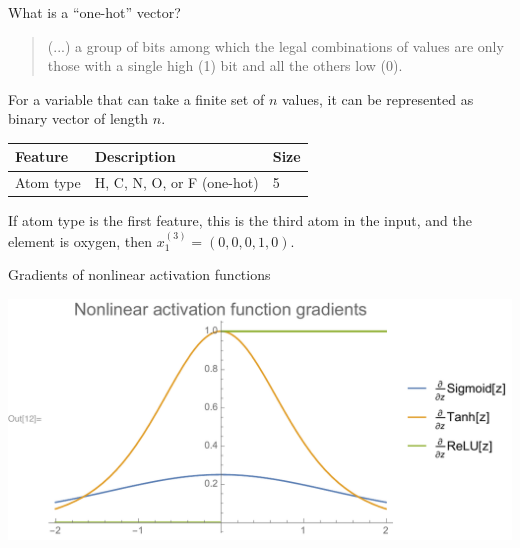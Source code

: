 \documentclass[xetex,compress]{beamer}
\begin{document}
\begin{frame}{What is a ``one-hot'' vector?}
  \begin{quote}
    (...) a group of bits among which the legal combinations of values are only those with a single high (1) bit and all the others low (0).
  \end{quote}
  For a variable that can take a finite set of \(n\) values, it can be represented as binary vector of length \(n\).
  \begin{table}[htbp]
    \centering
    \begin{tabular}{@{}lll@{}}
      \toprule
      Feature & Description & Size \\ \midrule
      Atom type & H, C, N, O, or F (one-hot) & 5 \\ \bottomrule
    \end{tabular}
  \end{table}
  If atom type is the first feature, this is the third atom in the input, and the element is oxygen, then \(x_{1}^{(3)} = (0, 0, 0, 1, 0)\).
\end{frame}

\begin{frame}{Gradients of nonlinear activation functions}
  \begin{center}
    \includegraphics[width=1.00\textwidth]{./figures/nonlinear_activation_gradients.pdf}
  \end{center}
\end{frame}

\end{document}
